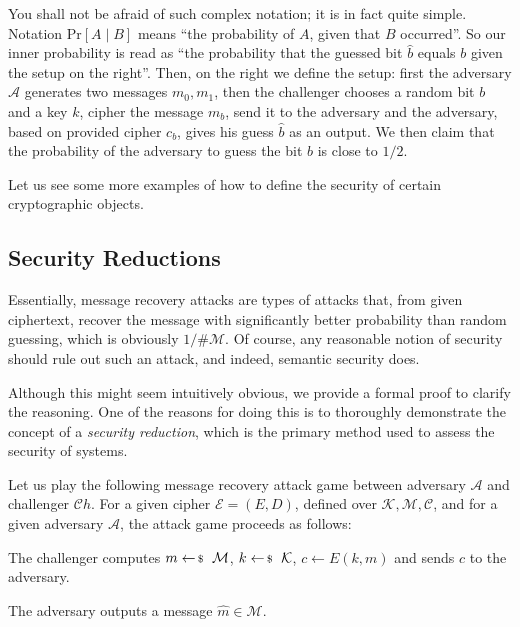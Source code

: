 \documentclass[../../book.tex]{subfiles}
\begin{document}
You shall not be afraid of such complex notation; it is in fact quite simple. Notation $\text{Pr}[A \mid B]$ means ``the probability of $A$, given that $B$ occurred''. So our inner probability is read as ``the probability that the guessed bit $\widehat{b}$ equals $b$ given the setup on the right''. 
Then, on the right we define the setup: first the adversary $\mathcal{A}$ generates two messages $m_0,m_1$, then the challenger chooses a random bit $b$ and a key $k$, cipher the message $m_b$, send it to the adversary and the adversary, based on provided cipher $c_b$, gives his guess $\widehat{b}$ as an output. 
We then claim that the probability of the adversary to guess the bit $b$ is close to $1/2$.

Let us see some more examples of how to define the security of certain cryptographic objects.

\subsection{Security Reductions}\label{subsec:security-reduction}

Essentially, message recovery attacks \cite[chapter 2]{Dan_Boneh_2023} are types of attacks that, from given ciphertext, recover the message with significantly better probability than random guessing, which is obviously $1/\#\mathcal{M}$.
Of course, any reasonable notion of security should rule out such an attack, and indeed, semantic security does.

Although this might seem intuitively obvious, we provide a formal proof to clarify the reasoning. 
One of the reasons for doing this is to thoroughly demonstrate the concept of a \emph{security reduction}, which is the primary method used to assess the security of systems.

Let us play the following message recovery attack game between adversary $\mathcal{A}$ and challenger $\mathcal{C}h$.
For a given cipher $\mathcal{E} = (E, D)$, defined over $\mathcal{K}, \mathcal{M}, \mathcal{C}$, and for a given adversary $\mathcal{A}$, the attack game proceeds as follows: 

\begin{algoen}
    \item The challenger computes $m \leftarrowS \mathcal{M}$, $k \leftarrowS \mathcal{K}$, $c \gets E(k, m)$ and sends $c$ to the adversary.
    \item The adversary outputs a message $\widehat{m} \in \mathcal{M}$.
\end{algoen}
\end{document}
